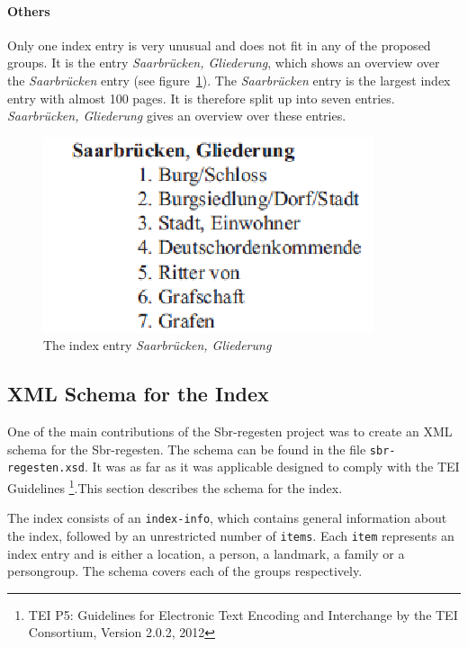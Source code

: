 \paragraph{Others}
\label{sec:other-index-entry}
Only one index entry is very unusual and does not fit in any of the proposed groups. It is the entry \textit{Saarbrücken, Gliederung}, which shows an overview over the \textit{Saarbrücken} entry (see figure~\ref{fig:sb-gliederung}). The \textit{Saarbrücken} entry is the largest index entry with almost 100 pages. It is therefore split up into seven entries. \textit{Saarbrücken, Gliederung} gives an overview over these entries.

\begin{figure}[h]
  \centering
  \includegraphics[scale=0.6]{img/sb-gliederung}
  \caption{The index entry \textit{Saarbrücken, Gliederung}}
  \label{fig:sb-gliederung}
\end{figure}


\subsection{XML Schema for the Index}

One of the main contributions of the Sbr-regesten project was to create an XML schema for the Sbr-regesten. The schema can be found in the file \texttt{sbr-regesten.xsd}.
It was as far as it was applicable designed to comply with the TEI Guidelines \footnote{TEI P5: Guidelines for Electronic Text Encoding and Interchange by the TEI Consortium, Version 2.0.2, 2012}.This section describes the schema for the index.

The index consists of an \texttt{index-info}, which contains general information about the index, followed by an unrestricted number of \texttt{items}. Each \texttt{item} represents an index entry and is either a location, a person, a landmark, a family or a persongroup. The schema covers each of the groups respectively.

